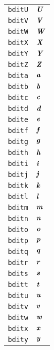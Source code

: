 \begin{longtable}{ll}
\texttt{bditU}&${}{\textbf{\textit{U}}}{}$\\
\texttt{bditV}&${}{\textbf{\textit{V}}}{}$\\
\texttt{bditW}&${}{\textbf{\textit{W}}}{}$\\
\texttt{bditX}&${}{\textbf{\textit{X}}}{}$\\
\texttt{bditY}&${}{\textbf{\textit{Y}}}{}$\\
\texttt{bditZ}&${}{\textbf{\textit{Z}}}{}$\\
\texttt{bdita}&${}{\textbf{\textit{a}}}{}$\\
\texttt{bditb}&${}{\textbf{\textit{b}}}{}$\\
\texttt{bditc}&${}{\textbf{\textit{c}}}{}$\\
\texttt{bditd}&${}{\textbf{\textit{d}}}{}$\\
\texttt{bdite}&${}{\textbf{\textit{e}}}{}$\\
\texttt{bditf}&${}{\textbf{\textit{f}}}{}$\\
\texttt{bditg}&${}{\textbf{\textit{g}}}{}$\\
\texttt{bdith}&${}{\textbf{\textit{h}}}{}$\\
\texttt{bditi}&${}{\textbf{\textit{i}}}{}$\\
\texttt{bditj}&${}{\textbf{\textit{j}}}{}$\\
\texttt{bditk}&${}{\textbf{\textit{k}}}{}$\\
\texttt{bditl}&${}{\textbf{\textit{l}}}{}$\\
\texttt{bditm}&${}{\textbf{\textit{m}}}{}$\\
\texttt{bditn}&${}{\textbf{\textit{n}}}{}$\\
\texttt{bdito}&${}{\textbf{\textit{o}}}{}$\\
\texttt{bditp}&${}{\textbf{\textit{p}}}{}$\\
\texttt{bditq}&${}{\textbf{\textit{q}}}{}$\\
\texttt{bditr}&${}{\textbf{\textit{r}}}{}$\\
\texttt{bdits}&${}{\textbf{\textit{s}}}{}$\\
\texttt{bditt}&${}{\textbf{\textit{t}}}{}$\\
\texttt{bditu}&${}{\textbf{\textit{u}}}{}$\\
\texttt{bditv}&${}{\textbf{\textit{v}}}{}$\\
\texttt{bditw}&${}{\textbf{\textit{w}}}{}$\\
\texttt{bditx}&${}{\textbf{\textit{x}}}{}$\\
\texttt{bdity}&${}{\textbf{\textit{y}}}{}$\\

\end{longtable}
